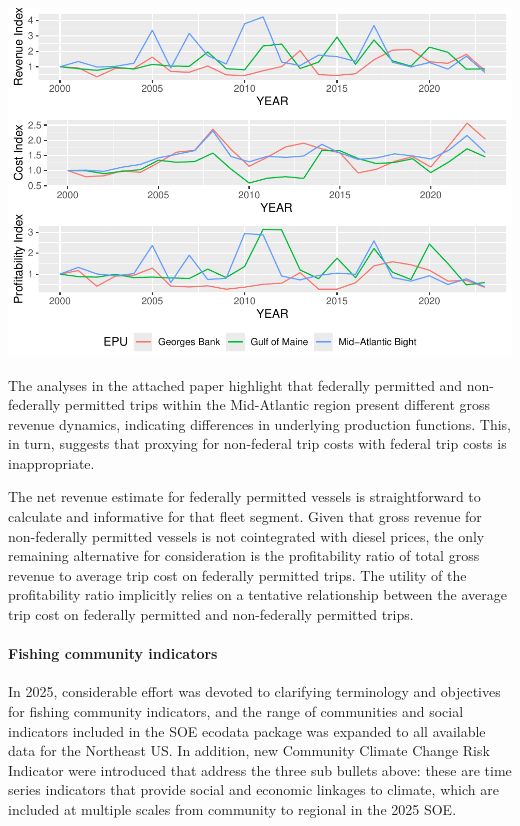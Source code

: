 \documentclass[
  10pt,
]{article}
\let\origfigure\figure
\let\endorigfigure\endfigure
\renewenvironment{figure}[1][2] {
    \expandafter\origfigure\expandafter[H]
} {
    \endorigfigure
}
\begin{document}
\begin{figure}

{\centering \includegraphics[width=0.8\linewidth]{images/Profitability-1} 

}

\caption{Revenue, Cost, and Profitability Indices by region}\label{fig:profits}
\end{figure}

The analyses in the attached paper highlight that federally permitted
and non-federally permitted trips within the Mid-Atlantic region present
different gross revenue dynamics, indicating differences in underlying
production functions. This, in turn, suggests that proxying for
non-federal trip costs with federal trip costs is inappropriate.

The net revenue estimate for federally permitted vessels is
straightforward to calculate and informative for that fleet segment.
Given that gross revenue for non-federally permitted vessels is not
cointegrated with diesel prices, the only remaining alternative for
consideration is the profitability ratio of total gross revenue to
average trip cost on federally permitted trips. The utility of the
profitability ratio implicitly relies on a tentative relationship
between the average trip cost on federally permitted and non-federally
permitted trips.

\hypertarget{fishing-community-indicators}{%
\paragraph{Fishing community
indicators}\label{fishing-community-indicators}}

In 2025, considerable effort was devoted to clarifying terminology and
objectives for fishing community indicators, and the range of
communities and social indicators included in the SOE ecodata package
was expanded to all available data for the Northeast US. In addition,
new Community Climate Change Risk Indicator were introduced that address
the three sub bullets above: these are time series indicators that
provide social and economic linkages to climate, which are included at
multiple scales from community to regional in the 2025 SOE.
\end{document}
